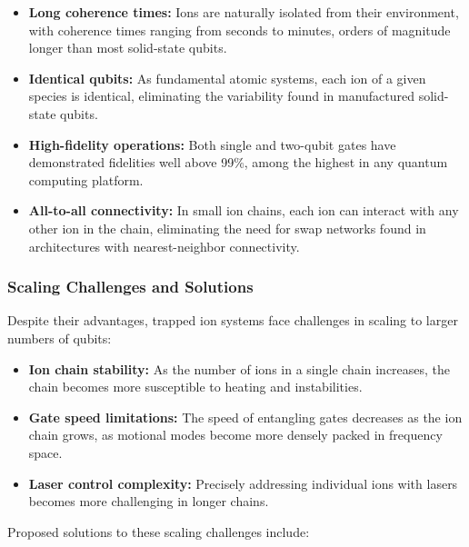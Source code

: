 \begin{itemize}
  \item \textbf{Long coherence times:} Ions are naturally isolated from their
    environment, with coherence times ranging from seconds to minutes, orders
    of magnitude longer than most solid-state qubits.

  \item \textbf{Identical qubits:} As fundamental atomic systems, each ion of
    a given species is identical, eliminating the variability found in
    manufactured solid-state qubits.

  \item \textbf{High-fidelity operations:} Both single and two-qubit gates
    have demonstrated fidelities well above 99\%, among the highest in any
    quantum computing platform.

  \item \textbf{All-to-all connectivity:} In small ion chains, each ion can
    interact with any other ion in the chain, eliminating the need for swap
    networks found in architectures with nearest-neighbor connectivity.
\end{itemize}

\subsubsection*{Scaling Challenges and Solutions}

Despite their advantages, trapped ion systems face challenges in scaling to
larger numbers of qubits:

\begin{itemize}
  \item \textbf{Ion chain stability:} As the number of ions in a single chain
    increases, the chain becomes more susceptible to heating and instabilities.

  \item \textbf{Gate speed limitations:} The speed of entangling gates
    decreases as the ion chain grows, as motional modes become more densely
    packed in frequency space.

  \item \textbf{Laser control complexity:} Precisely addressing individual
    ions with lasers becomes more challenging in longer chains.
\end{itemize}

Proposed solutions to these scaling challenges include:

